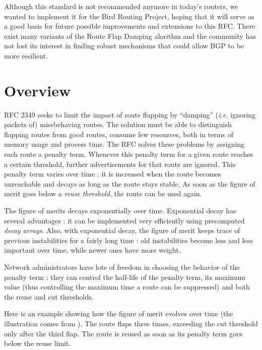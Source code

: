 \documentclass[a4paper,english]{IEEEtran}
\begin{document}
Although this standard is not recommended anymore\cite{ripe recommendations}
in today's routers, we wanted to implement it for the Bird Routing
Project\cite{bird}, hoping that it will serve as a good basis for
future possible improvements and extensions to this RFC. There exist
many variants of the Route Flap Damping alorithm and the community
has not lost its interest in finding robust mechanisms that could
allow BGP to be more resilient.


\section{Overview}

RFC 2349 seeks to limit the impact of route flapping by {}``damping''
(\textit{i.e.} ignoring packets of) missbehaving routes. The solution
must be able to distinguish flapping routes from good routes, consume
few resources, both in terms of memory usage and process time. The
RFC solves these problems by assigning each route a penalty term.
Whenever this penalty term for a given route reaches a certain threshold,
further advertisements for that route are ignored. This penalty term
varies over time : it is increased when the route becomes unreachable
and decays as long as the route stays stable. As soon as the figure
of merit goes below a \textit{reuse threshold}, the route can be used
again.

The figure of merits decays exponentially over time. Exponential decay
has several advantages : it can be implemented very efficiently using
precomputed \textit{decay arrays}. Also, with exponential decay, the
figure of merit keeps trace of previous instabilities for a fairly
long time : old instabilities become less and less important over
time, while newer ones have more weight.

Network administrators have lots of freedom in choosing the behavior
of the penalty term : they can control the half-life of the penalty
term, its maximum value (thus controlling the maximum time a route
can be suppressed) and both the reuse and cut thresholds.

Here is an example showing how the figure of merit evolves over time
(the illustration comes from \cite{damping-pic}). The route flaps
three times, exceeding the cut threshold only after the third flap.
The route is reused as soon as its penalty term goes below the reuse
limit.
\end{document}
